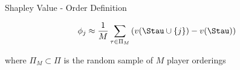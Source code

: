 \documentclass[11pt,compress,t,notes=noshow, aspectratio=169, xcolor=table]{beamer}
\begin{document}
\begin{frame}{Shapley Value - Order Definition}
\begin{itemize}[<+->]
\[
\phi_j \approx \frac{1}{M} \sum_{\tau \in \Pi_M} \left(v(\Stau \cup \{j\}) - v(\Stau)\right)
\]

where \( \Pi_M \subset \Pi \) is the random sample of \( M \) player orderings
\end{itemize}

\end{frame}
\end{document}
